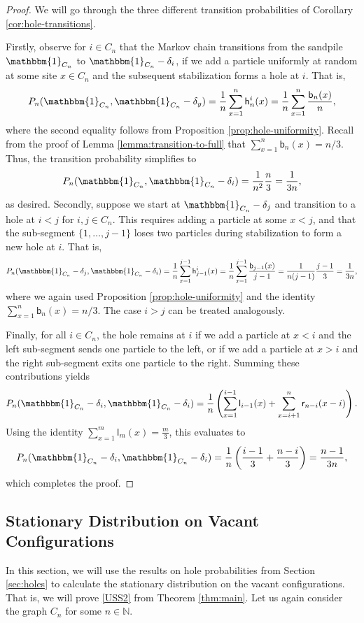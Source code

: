 \documentclass[11pt]{article}
\newcommand{\N}{\mathbb{N}}
\newcommand{\one}{\mathbbm{1}}
\newcommand{\sgrleft}[2]{\mathsf{l}_{#1}(#2)}
\newcommand{\sgrright}[2]{\mathsf{r}_{#1}(#2)}
\newcommand{\sgrboth}[2]{\mathsf{b}_{#1}(#2)}
\newcommand{\trans}[1]{P_{#1}}
\begin{document}
\begin{proof}
    We will go through the three different transition probabilities of Corollary \ref{cor:hole-transitions}.
    
    Firstly, observe for $i\in C_n$ that the Markov chain transitions from the sandpile $\one_{C_n}$ to $\one_{C_n} - \delta_i$, if we add a particle uniformly at random at some site $x \in C_n$ and the subsequent stabilization forms a hole at $i$. That is, 
    $$ \trans{n}(\one_{C_n}, \one_{C_n} - \delta_y) = \frac{1}{n} \sum_{x=1}^n \mathsf{h}_n^i(x) = \frac{1}{n} \sum_{x=1}^n \frac{\sgrboth{n}{x}}{n},$$
    where the second equality follows from Proposition \ref{prop:hole-uniformity}.
    Recall from the proof of Lemma \ref{lemma:transition-to-full} that $\sum_{x=1}^n \sgrboth{n}{x} = n/3$. Thus, the transition probability simplifies to $$ \trans{n}(\one_{C_n}, \one_{C_n} - \delta_i)=\frac{1}{n^2}  \frac{n}{3}  = \frac{1}{3n},$$
    as desired.
    Secondly, suppose we start at $\one_{C_n} - \delta_j$ and transition to a hole at $i < j$ for $i,j\in C_n$. This requires adding a particle at some $x < j$, and that the sub-segment $\{1, \dots, j-1\}$ loses two particles during stabilization to form a new hole at $i$. That is, 
    $$ \trans{n}(\one_{C_n} - \delta_j, \one_{C_n} - \delta_i) = \frac{1}{n} \sum_{x=1}^{j-1} \mathsf{h}_{j-1}^i(x) = \frac{1}{n} \sum_{x=1}^{j-1} \frac{\sgrboth{j-1}{x}}{j-1} = \frac{1}{n(j-1)} \frac{j-1}{3} = \frac{1}{3n}, $$
    where we again used Proposition \ref{prop:hole-uniformity} and the identity $\sum_{x=1}^n \sgrboth{n}{x} = n/3$.
    The case $i > j$ can be treated analogously.
    
    Finally, for all $i\in C_n$, the hole remains at $i$ if we add a particle at $x < i$ and the left sub-segment sends one particle to the left, or if we add a particle at $x > i$ and the right sub-segment exits one particle to the right. Summing these contributions yields
    $$ \trans{n}(\one_{C_n} - \delta_i, \one_{C_n} - \delta_i) = \frac{1}{n} \left( \sum_{x=1}^{i-1} \sgrleft{i-1}{x} + \sum_{x=i+1}^n \sgrright{n-i}{x-i} \right). $$
    Using the identity $\sum_{x=1}^m \sgrleft{m}{x} = \frac{m}{3}$, this evaluates to
    $$ \trans{n}(\one_{C_n} - \delta_i, \one_{C_n} - \delta_i)= \frac{1}{n} \left( \frac{i-1}{3} + \frac{n-i}{3} \right) = \frac{n-1}{3n}, $$
    which completes the proof.
\end{proof}
\subsection{Stationary Distribution on Vacant Configurations}\label{sec:vacant}
In this section, we will use the results on hole probabilities from Section \ref{sec:holes} to calculate the stationary distribution on the vacant configurations. That is, we will prove \ref{USS2} from Theorem \ref{thm:main}. Let us again consider the graph $C_n$ for some $n\in\N$.
\end{document}
